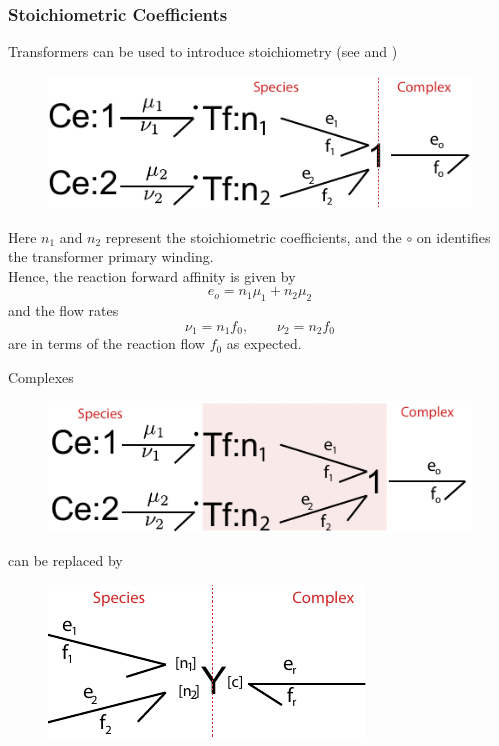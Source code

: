 \documentclass[10pt,reqno]{beamer}
\begin{document}
\begin{frame}
\frametitle{Stoichiometric Coefficients}
Transformers can be used to introduce stoichiometry (see \cite{Oster:1973aa} and \cite{Gawthrop:2014aa})
\begin{figure}
	\includegraphics[scale=0.5]{images/stoic_oster}
\end{figure}
Here $n_1$ and $n_2$ represent the stoichiometric coefficients, and the $\circ$ on identifies the transformer primary winding.\\
Hence, the reaction forward affinity is given by
\[
e_o = n_1\mu_1 + n_2 \mu_2
\]
and the flow rates 
\[
\nu_1 = n_1f_0,\qquad \nu_2 = n_2f_0
\]
are in terms of the reaction flow $f_0$ as expected.
\end{frame}
\begin{frame}{Complexes}
\begin{center}
	\begin{figure}
		\includegraphics[scale=0.6]{images/stoic_oster_Y}
	\end{figure}
can be replaced by
\end{center}
\begin{figure}
\includegraphics[scale=0.6]{images/stoic_Y}
\end{figure}
\end{frame}
\end{document}
